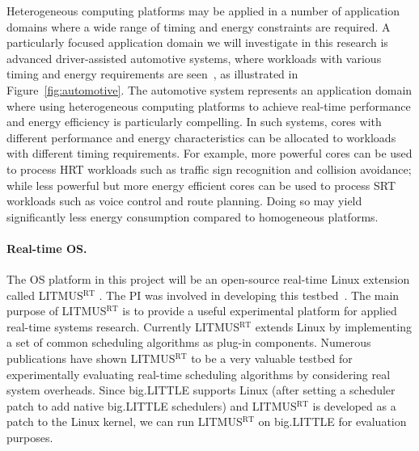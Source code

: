 Heterogeneous computing platforms may be applied in a number of application domains where a wide range of timing and energy constraints are required. A particularly focused application domain we will investigate in this research is advanced driver-assisted automotive systems, where workloads with various timing and energy requirements are seen~\cite{elliott2011real}, as illustrated in Figure~\ref{fig:automotive}.  
The automotive system represents an application domain where using heterogeneous computing platforms to achieve real-time performance and energy efficiency is particularly compelling. 
 In such systems, cores with different performance and energy characteristics can be allocated to workloads with different timing requirements. For example, more powerful cores can be used to process HRT workloads such as traffic sign recognition and collision avoidance; while less powerful but more energy efficient cores can be used to process SRT workloads such as voice control and route planning. Doing so may yield significantly less energy consumption compared to homogeneous platforms. %


\paragraph{Real-time OS.} The OS platform in this project will be an open-source real-time Linux extension called LITMUS$^{\textrm{RT}}$ \cite{LITMUS}. The PI was involved in developing this testbed~\cite{elliott1minimizing, Liudissertation}. The main purpose of LITMUS$^{\textrm{RT}}$ is to provide a useful experimental platform for applied real-time systems research. Currently LITMUS$^{\textrm{RT}}$ extends Linux by implementing a set of common scheduling algorithms as plug-in components. Numerous  publications \cite{elliott1minimizing, elliott1minimizing, Liudissertation, BBBdissertation, clustered, calandrino2008cache, johndissertation} have shown LITMUS$^{\textrm{RT}}$ to be a very valuable testbed for experimentally evaluating real-time scheduling algorithms by considering real system overheads. 
 Since big.LITTLE supports Linux (after setting a scheduler patch to add native big.LITTLE schedulers) and LITMUS$^{\textrm{RT}}$ is developed as a patch to the Linux kernel, we can run LITMUS$^{\textrm{RT}}$ on big.LITTLE for evaluation purposes.